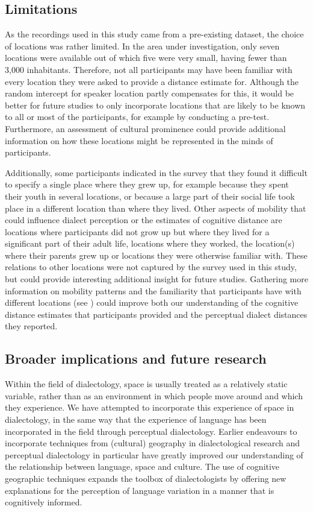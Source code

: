 \documentclass[output=paper,colorlinks,citecolor=brown,draft]{langscibook}
\begin{document}
\subsection{Limitations}
As the recordings used in this study came from a pre-existing dataset, the choice of locations was rather limited. In the area under investigation, only seven locations were available out of which five were very small, having fewer than 3,000 inhabitants. Therefore, not all participants may have been familiar with every location they were asked to provide a distance estimate for. Although the random intercept for speaker location partly compensates for this, it would be better for future studies to only incorporate locations that are likely to be known to all or most of the participants, for example by conducting a pre-test. Furthermore, an assessment of cultural prominence \citep{montgomery_effect_2012} could provide additional information on how these locations might be represented in the minds of participants.

Additionally, some participants indicated in the survey that they found it difficult to specify a single place where they grew up, for example because they spent their youth in several locations, or because a large part of their social life took place in a different location than where they lived. Other aspects of mobility that could influence dialect perception or the estimates of cognitive distance are locations where participants did not grow up but where they lived for a significant part of their adult life, locations where they worked, the location(s) where their parents grew up or locations they were otherwise familiar with. These relations to other locations were not captured by the survey used in this study, but could provide interesting additional insight for future studies. Gathering more information on mobility patterns and the familiarity that participants have with different locations (see \citealt{JeszenszkyEtAl2024}) could improve both our understanding of the cognitive distance estimates that participants provided and the perceptual dialect distances they reported.

\subsection{Broader implications and future research}
Within the field of dialectology, space is usually treated as a relatively static variable, rather than as an environment in which people move around and which they experience. We have attempted to incorporate this experience of space in dialectology, in the same way that the experience of language has been incorporated in the field through perceptual dialectology. Earlier endeavours to incorporate techniques from (cultural) geography in dialectological research and perceptual dialectology in particular have greatly improved our understanding of the relationship between language, space and culture. The use of cognitive geographic techniques expands the toolbox of dialectologists by offering new explanations for the perception of language variation in a manner that is cognitively informed.
\end{document}
